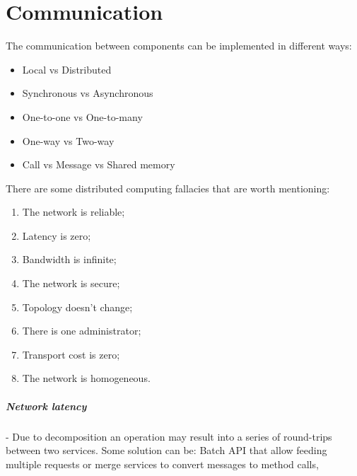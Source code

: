 \chapter{Communication}

\begin{flushleft}
  \begin{minipage}[t]{0.47\linewidth}
    \raggedright
    The communication between components can be implemented in different ways:

    \begin{itemize}
      \item Local vs Distributed
      \item Synchronous vs Asynchronous
      \item One-to-one vs One-to-many
      \item One-way vs Two-way
      \item Call vs Message vs Shared memory
    \end{itemize}
  \end{minipage}%
  \hfill
  \begin{minipage}[t]{0.47\linewidth}
    \raggedright
    There are some distributed computing fallacies that are worth mentioning:

    \begin{enumerate}

      \item The network is reliable;
      \item Latency is zero;
      \item Bandwidth is infinite;
      \item The network is secure;
      \item Topology doesn't change;
      \item There is one administrator;
      \item Transport cost is zero;
      \item The network is homogeneous.

    \end{enumerate}
  \end{minipage}
\end{flushleft}

\paragraph{Network latency} - Due to decomposition an operation may result into
a series of round-trips between two services.
Some solution can be: Batch API that allow feeding multiple
requests or merge services to convert messages to
method calls,


